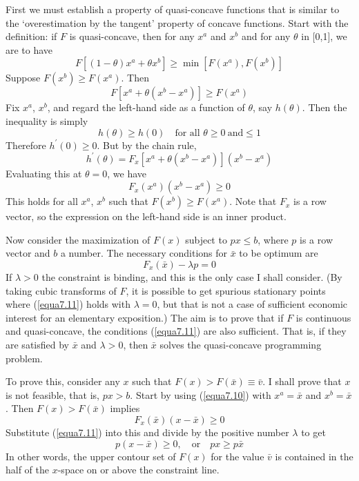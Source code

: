 First we must establish a property of quasi-concave functions that is similar to the `overestimation by the tangent' property of concave functions. Start with the definition: if $F$ is quasi-concave, then for any $x^a$ and $x^b$ and for any $\theta$ in [0,1], we are to have
\begin{equation*}
F[(1-\theta)x^a + \theta x^b] \geq \min [F(x^a), F(x^b)]
\end{equation*}
Suppose $F(x^b) \geq F(x^a)$. Then
\begin{equation*}
F[ x^a + \theta (x^b - x^a)] \geq F(x^a)
\end{equation*}
Fix $x^a$, $x^b$, and regard the left-hand side as a function of $\theta$, say $h(\theta)$. Then the inequality is simply
\begin{equation*}
 h(\theta) \geq h(0) \quad \mbox{for all } \theta \geq 0 \ \mbox{and} \leq 1
\end{equation*}
Therefore $h^\prime(0) \geq 0$. But by the chain rule,
\begin{equation*}
 h^\prime(\theta) = F_x[x^a + \theta (x^b - x^a)]  (x^b - x^a)
\end{equation*}
Evaluating this at $\theta =0$, we have
\begin{equation} \label{equa7.10}
F_x(x^a) (x^b - x^a) \geq 0
\end{equation}
This holds for all $x^a$, $x^b$ such that $F(x^b) \geq F(x^a)$. Note that $F_x$ is a row vector, so the expression on the left-hand side is an inner product.

Now consider the maximization of $F(x)$ subject to $px \leq b$, where $p$ is a row vector and $b$ a number. The necessary conditions for $\bar{x}$ to be optimum are 
\begin{equation} \label{equa7.11}
F_x(\bar{x}) - \lambda p = 0
\end{equation}
If $\lambda > 0$ the constraint is binding, and this is the only case I shall consider. (By taking cubic transforms of $F$, it is possible to get spurious stationary points where (\ref{equa7.11}) holds with $\lambda =0$, but that is not a case of sufficient economic interest for an elementary exposition.) The aim is to prove that if $F$ is continuous and quasi-concave, the conditions (\ref{equa7.11}) are also sufficient. That is, if they are satisfied by $\bar{x}$ and $\lambda >0$, then $\bar{x}$ solves the quasi-concave programming problem.

To prove this, consider any $x$ such that $F(x) > F(\bar{x}) \equiv \bar{v}$. I shall prove that $x$ is not feasible, that is, $px > b$. Start by using (\ref{equa7.10}) with $x^a = \bar{x}$ and $x^b = \bar{x}$. Then $F(x) > F(\bar{x})$ implies
\begin{equation*}
F_x(\bar{x}) (x-\bar{x}) \geq 0
\end{equation*}
Substitute (\ref{equa7.11}) into this and divide by the positive number $\lambda$ to get
\begin{equation*}
p(x - \bar{x}) \geq 0, \quad \mbox{or} \quad px \geq p \bar{x}
\end{equation*}
In other words, the upper contour set of $F(x)$ for the value $\bar{v}$ is contained in the half of the $x$-space on or above the constraint line.

